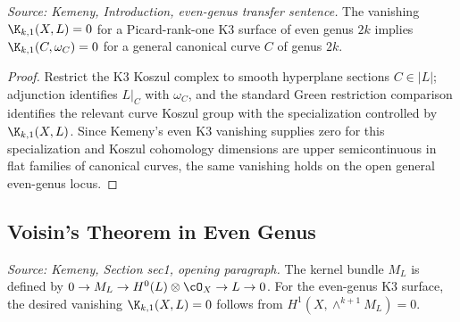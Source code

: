 \begin{lemma}
  \label{lem:kemeny_even_k3_section_to_general_curve}
  \textit{Source: Kemeny, Introduction, even-genus transfer sentence.}
  The vanishing \(\K_{k,1}(X,L)=0\) for a Picard-rank-one K3 surface of even
  genus \(2k\) implies \(\K_{k,1}(C,\omega_C)=0\) for a general canonical curve
  \(C\) of genus \(2k\).
\end{lemma}
\begin{proof}
  Restrict the K3 Koszul complex to smooth hyperplane sections \(C\in |L|\);
  adjunction identifies \(L|_C\) with \(\omega_C\), and the standard Green
  restriction comparison identifies the relevant curve Koszul group with the
  specialization controlled by \(\K_{k,1}(X,L)\).  Since Kemeny's even K3
  vanishing supplies zero for this specialization and Koszul cohomology
  dimensions are upper semicontinuous in flat families of canonical curves, the
  same vanishing holds on the open general even-genus locus.
\end{proof}

\subsection{Voisin's Theorem in Even Genus}

\begin{definition}
  \label{def:kemeny_kernel_bundle_reduction}
  \textit{Source: Kemeny, Section sec1, opening paragraph.}
  The kernel bundle \(M_L\) is defined by
  \(0\to M_L\to H^0(L)\otimes \cO_X\to L\to0\).  For the even-genus K3
  surface, the desired vanishing \(\K_{k,1}(X,L)=0\) follows from
  \(H^1(X,\wedge^{k+1}M_L)=0\).
\end{definition}

